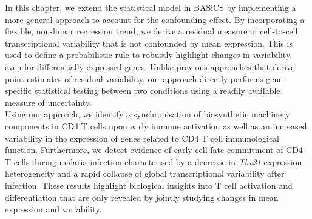 In this chapter, we extend the statistical model in BASiCS by implementing a more general approach to account for the confounding effect. By incorporating a flexible, non-linear regression trend, we derive a residual measure of cell-to-cell transcriptional variability that is not confounded by mean expression. This is used to define a probabilistic rule to robustly highlight changes in variability, even for differentially expressed genes. Unlike previous approaches that derive point estimates of residual variability, our approach directly performs gene-specific statistical testing between two conditions using a readily available measure of uncertainty. \\

Using our approach, we identify a synchronisation of  biosynthetic machinery components in CD4\plus{} T cells upon early immune activation as well as an increased variability in the expression of genes related to CD4\plus{} T cell immunological function.
Furthermore, we detect evidence of early cell fate commitment of CD4\plus{} T cells during malaria infection characterised by a decrease in \textit{Tbx21} expression heterogeneity and a rapid collapse of global transcriptional variability after infection. These results highlight biological insights into T cell activation and differentiation that are only revealed by jointly studying changes in mean expression and variability.
